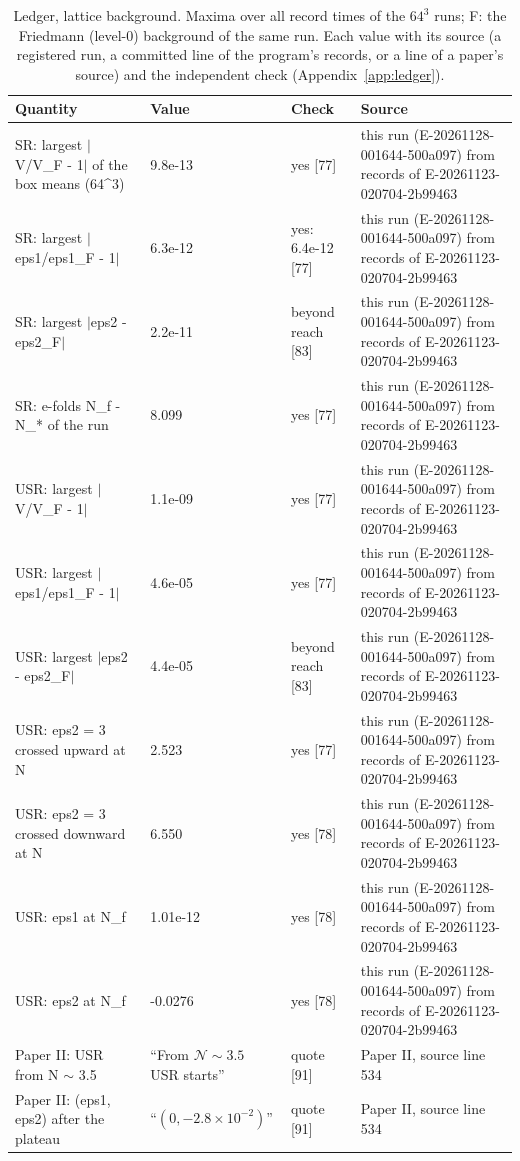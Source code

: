 \begin{table}
\caption{Ledger, lattice background. Maxima over all record times of the $64^3$ runs; F: the Friedmann (level-0) background of the same run. Each value with its source (a registered run, a committed line of the program's records, or a line of a paper's source) and the independent check (Appendix~\ref{app:ledger}).}
\label{tab:ledgerlatticebackground}
\footnotesize
\begin{tabular}{p{}p{}p{}p{}}
\toprule
Quantity & Value & Check & Source \\
\midrule
SR: largest $|$V/\allowbreak{}V\_F - 1$|$ of the box means (64\^{}3) & 9.8e-13 & yes [77] & this run (E-20261128-001644-500a097) from records of E-20261123-020704-2b99463 \\
SR: largest $|$eps1/\allowbreak{}eps1\_F - 1$|$ & 6.3e-12 & yes: 6.4e-12 [77] & this run (E-20261128-001644-500a097) from records of E-20261123-020704-2b99463 \\
SR: largest $|$eps2 - eps2\_F$|$ & 2.2e-11 & beyond reach [83] & this run (E-20261128-001644-500a097) from records of E-20261123-020704-2b99463 \\
SR: e-folds N\_f - N\_* of the run & 8.099 & yes [77] & this run (E-20261128-001644-500a097) from records of E-20261123-020704-2b99463 \\
USR: largest $|$V/\allowbreak{}V\_F - 1$|$ & 1.1e-09 & yes [77] & this run (E-20261128-001644-500a097) from records of E-20261123-020704-2b99463 \\
USR: largest $|$eps1/\allowbreak{}eps1\_F - 1$|$ & 4.6e-05 & yes [77] & this run (E-20261128-001644-500a097) from records of E-20261123-020704-2b99463 \\
USR: largest $|$eps2 - eps2\_F$|$ & 4.4e-05 & beyond reach [83] & this run (E-20261128-001644-500a097) from records of E-20261123-020704-2b99463 \\
USR: eps2 = 3 crossed upward at N & 2.523 & yes [77] & this run (E-20261128-001644-500a097) from records of E-20261123-020704-2b99463 \\
USR: eps2 = 3 crossed downward at N & 6.550 & yes [78] & this run (E-20261128-001644-500a097) from records of E-20261123-020704-2b99463 \\
USR: eps1 at N\_f & 1.01e-12 & yes [78] & this run (E-20261128-001644-500a097) from records of E-20261123-020704-2b99463 \\
USR: eps2 at N\_f & -0.0276 & yes [78] & this run (E-20261128-001644-500a097) from records of E-20261123-020704-2b99463 \\
Paper II: USR from N $\sim$ 3.5 & ``From $\mathcal{N} \sim 3.5$ USR starts'' & quote [91] & Paper II, source line 534 \\
Paper II: (eps1, eps2) after the plateau & ``$\left(0,-2.8 \times  10^{-2}\right)$'' & quote [91] & Paper II, source line 534 \\
\bottomrule
\end{tabular}
\end{table}

